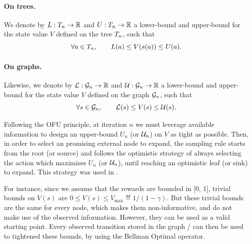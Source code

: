 \documentclass[runningheads]{llncs}
\begin{document}
\begin{definition}
\paragraph{\textbf{On trees.}} We denote by $L:T_n \rightarrow \mathbb{R}$ and  $U:T_n \rightarrow \mathbb{R}$ a lower-bound and upper-bound for the state value $V$ defined on the tree $T_n$, such that
\begin{equation*}
    \forall a\in T_n, \qquad L(a) \leq V(s(a)) \leq U(a).
\end{equation*}

\paragraph{\textbf{On graphs.}} Likewise, we denote by $\mathcal{L}:\mathcal{G}_n \rightarrow \mathbb{R}$ and  $\mathcal{U}:\mathcal{G}_n \rightarrow \mathbb{R}$ a lower-bound and upper-bound for the state value $V$ defined on the graph $\mathcal{G}_n$, such that
\begin{equation*}
\forall s\in\mathcal{G}_n, \qquad \mathcal{L}(s) \leq V(s) \leq \mathcal{U}(s).
\end{equation*}
\end{definition}

Following the OFU principle, at iteration $n$ we must leverage available information to design an upper-bound $U_n$ (or $\mathcal{U}_n$) on $V$ as tight as possible. Then, in order to select an promising external node to expand, the sampling rule starts from the root (or source) and follows the optimistic strategy of always selecting the action which maximises $U_n$ (or $\mathcal{U}_n$), until reaching an optimistic leaf (or sink) to expand. This strategy was used in \citep[e.g.][]{Kocsis06UCT, Hren2008optimistic, Bubeck2010open, Busoniu2012optimistic}.

For instance, since we assume that the rewards are bounded in [0, 1], trivial bounds on $V(s)$ are
$0 \leq V(s) \leq V_{\max} \eqdef {1}/({1-\gamma})$. But these trivial bounds are the same for every node, which makes them non-informative, and do not make use of the observed information. However, they can be used as a valid starting point. Every observed transition stored in the graph / can then be used to tightened these bounds, by using the Bellman Optimal operator.
\end{document}
